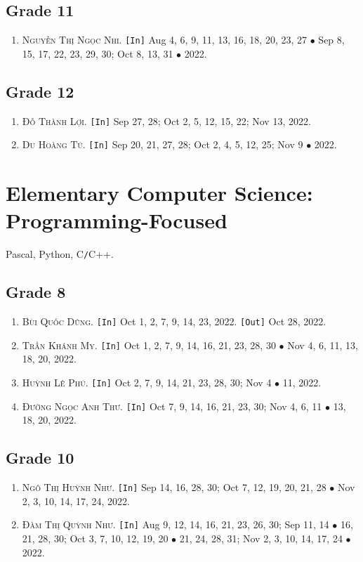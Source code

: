 \documentclass{article}
\numberwithin{equation}{section}
\begin{document}
\subsection{Grade 11}
\begin{enumerate}
	\item \textsc{Nguyễn Thị Ngọc Nhi.} \texttt{[In]} Aug 4, 6, 9, 11, 13, 16, 18, 20, 23, 27 $\bullet$ Sep 8, 15, 17, 22, 23, 29, 30; Oct 8, 13, 31 $\bullet$ 2022.
\end{enumerate}

\subsection{Grade 12}
\begin{enumerate}
	\item \textsc{Đỗ Thành Lợi.} \texttt{[In]} Sep 27, 28; Oct 2, 5, 12, 15, 22; Nov 13, 2022.
	\item \textsc{Du Hoàng Tú.} \texttt{[In]} Sep 20, 21, 27, 28; Oct 2, 4, 5, 12, 25; Nov 9 $\bullet$ 2022.
\end{enumerate}


\section{Elementary Computer Science: Programming-Focused}
Pascal, Python, C\texttt{/}C++.

\subsection{Grade 8}
\begin{enumerate}
	\item \textsc{Bùi Quốc Dũng.} \texttt{[In]} Oct 1, 2, 7, 9, 14, 23, 2022. \texttt{[Out]} Oct 28, 2022.
	\item \textsc{Trần Khánh My.} \texttt{[In]} Oct 1, 2, 7, 9, 14, 16, 21, 23, 28, 30 $\bullet$ Nov 4, 6, 11, 13, 18, 20, 2022.
	\item \textsc{Huỳnh Lê Phú.} \texttt{[In]} Oct 2, 7, 9, 14, 21, 23, 28, 30; Nov 4 $\bullet$ 11, 2022.
	\item \textsc{Đường Ngọc Anh Thư.} \texttt{[In]} Oct 7, 9, 14, 16, 21, 23, 30; Nov 4, 6, 11 $\bullet$ 13, 18, 20, 2022.
\end{enumerate}

\subsection{Grade 10}
\begin{enumerate}
	\item \textsc{Ngô Thị Huỳnh Như.} \texttt{[In]} Sep 14, 16, 28, 30; Oct 7, 12, 19, 20, 21, 28 $\bullet$ Nov 2, 3, 10, 14, 17, 24, 2022.
	\item \textsc{Đàm Thị Quỳnh Như.} \texttt{[In]} Aug 9, 12, 14, 16, 21, 23, 26, 30; Sep 11, 14 $\bullet$ 16, 21, 28, 30; Oct 3, 7, 10, 12, 19, 20 $\bullet$ 21, 24, 28, 31; Nov 2, 3, 10, 14, 17, 24 $\bullet$ 2022.
\end{enumerate}
\end{document}
